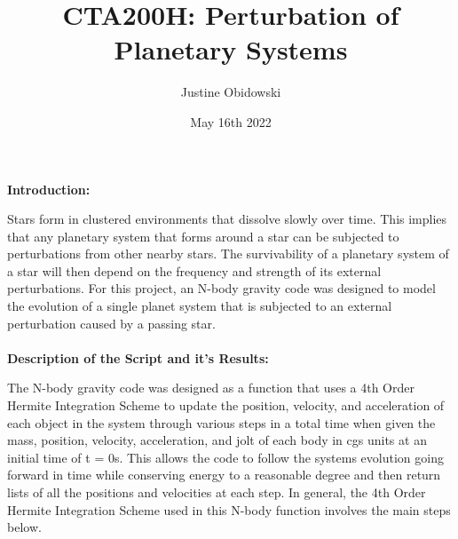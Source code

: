 \documentclass{article}
\title{CTA200H: Perturbation of Planetary Systems}
\author{Justine Obidowski}
\date{May 16th 2022}
\begin{document}
\maketitle

\newpage
\noindent\textbf{Introduction:}
\\
\text\par{Stars form in clustered environments that dissolve slowly over time. This implies that any planetary system that forms around a star can be subjected to perturbations from other nearby stars. The survivability of a planetary system of a star will then depend on the frequency and strength of its external perturbations. For this project, an N-body gravity code was designed to model the evolution of a single planet system that is subjected to an external perturbation caused by a passing star.}
\\
\\
\noindent\textbf{Description of the Script and it’s Results:}
\\
\text\par{The N-body gravity code was designed as a function that uses a 4th Order Hermite Integration Scheme to update the position, velocity, and acceleration of each object in the system through various steps in a total time when given the mass, position, velocity, acceleration, and jolt of each body in cgs units at an initial time of t = 0s. This allows the code to follow the systems evolution going forward in time while conserving energy to a reasonable degree and then return lists of all the positions and velocities at each step. In general, the 4th Order Hermite Integration Scheme used in this N-body function involves the main steps below.}
\\
\\
\end{document}
